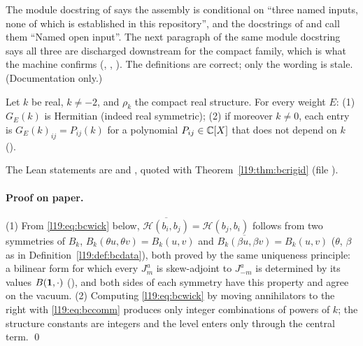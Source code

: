 \begin{warning}[title={Stale ``open input'' language in \texttt{AffineSl2BelowCriticalGradedUnitarity.lean}}]\label{l19:warn:bcstale}
The module docstring of  says the assembly is conditional on ``three
named inputs, none of which is established in this repository'', and the docstrings of  and
 call them ``Named open input''. The next paragraph of the same module docstring says all three
are discharged downstream for the compact family, which is what the machine confirms
(, , ). The definitions
are correct; only the wording is stale. (Documentation only.)
\end{warning}

\begin{lemma}\label{l19:lem:bcgram}
Let $k$ be real, $k\ne-2$, and $\rho_k$ the compact real structure. For every weight $E$: (1) $G_E(k)$ is Hermitian (indeed real
symmetric); (2) if moreover $k\ne0$, each entry is $G_E(k)_{ij} = P_{ij}(k)$ for a polynomial $P_{ij}\in{\mathbb{C}}[X]$ that does not depend
on $k$ ().
\end{lemma}
\noindent The Lean statements are  and , quoted with
Theorem~\ref{l19:thm:bcrigid} (file ).

\paragraph{Proof on paper.} (1) From \eqref{l19:eq:bcwick} below, $\overline{\mathcal H(b_i,b_j)} = \mathcal H(b_j,b_i)$ follows from two
symmetries of $B_k$, $B_k(\theta u,\theta v) = B_k(u,v)$ and $\overline{B_k(\beta u,\beta v)} = B_k(u,v)$ ($\theta$, $\beta$ as in
Definition~\ref{l19:def:bcdata}), both proved by the same uniqueness principle: a bilinear form for which every $J^a_m$ is
skew-adjoint to $J^a_{-m}$ is determined by its values $B(\mathbf{1},\cdot)$ (), and both
sides of each symmetry have this property and agree on the vacuum. (2) Computing \eqref{l19:eq:bcwick} by moving annihilators to
the right with \eqref{l19:eq:bccomm} produces only integer combinations of powers of $k$; the structure constants are
integers and the level enters only through the central term. \qed

